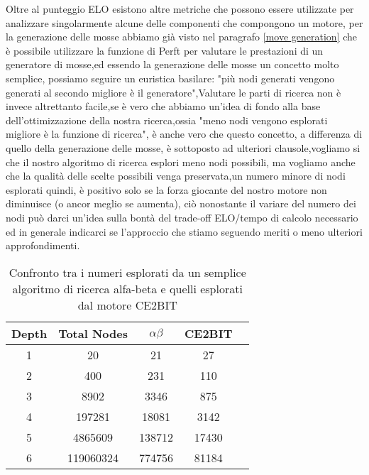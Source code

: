 Oltre al punteggio ELO esistono altre metriche che possono essere utilizzate per analizzare singolarmente alcune delle componenti che compongono un motore,
per la generazione delle mosse abbiamo già visto nel paragrafo \ref{move generation} che è possibile utilizzare la funzione di Perft per valutare le prestazioni di un generatore di mosse,ed essendo la generazione
delle mosse un concetto molto semplice, possiamo seguire un euristica basilare: "più nodi generati vengono generati al secondo migliore è il generatore",Valutare le parti 
di ricerca non è invece altrettanto facile,se è vero che abbiamo un'idea di fondo alla base dell'ottimizzazione della nostra ricerca,ossia "meno nodi vengono esplorati migliore è la funzione di ricerca", è anche vero 
che questo concetto, a differenza di quello della generazione delle mosse, è sottoposto ad ulteriori clausole,vogliamo si che il nostro algoritmo di ricerca esplori meno nodi possibili, ma vogliamo anche che la qualità
delle scelte possibili venga preservata,un numero minore di nodi esplorati quindi, è positivo solo se la forza giocante del nostro motore non diminuisce (o ancor meglio se aumenta), ciò nonostante il variare del numero dei nodi 
può darci un'idea sulla bontà del trade-off ELO/tempo di calcolo necessario ed in generale indicarci se l'approccio che stiamo seguendo meriti o meno ulteriori approfondimenti.
\begin{table}[h]
\begin{center}
    \begin{tabular}{|c|c|c|c|c|} 
     \hline
     Depth & Total Nodes  & $\alpha\beta$ & CE2BIT \\ [0.5ex] 
     \hline
     1 & 20  & 21 & 27 \\ 
     \hline
     2 & 400  &  231 & 110 \\
     \hline
     3 & 8902  &  3346 & 875 \\
     \hline
     4 & 197281  & 18081 &  3142 \\
     \hline
     5 & 4865609  & 138712 & 17430 \\ 
     \hline
     6 & 119060324  & 774756 &   81184 \\
     \hline
    \end{tabular}
    \caption{Confronto tra i numeri esplorati da un semplice algoritmo di ricerca alfa-beta e quelli esplorati dal motore CE2BIT} \label{tab:sometab}
    \end{center}
\end{table}


